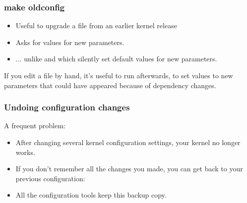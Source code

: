 \begin{frame}
  \frametitle{make oldconfig}
  \begin{itemize}
  \item Useful to upgrade a  file from an earlier kernel release
  \item Asks for values for new parameters.
  \item ... unlike  and  which silently set
  default values for new parameters.
  \end{itemize}
  If you edit a  file by hand, it's useful
  to run  afterwards, to set values to new
  parameters that could have appeared because of dependency changes.
\end{frame}

\begin{frame}
  \frametitle{Undoing configuration changes}
  A frequent problem:
  \begin{itemize}
  \item After changing several kernel configuration settings, your
    kernel no longer works.
  \item If you don't remember all the changes you made,
    you can get back to your previous configuration:\\
  \item All the configuration tools keep this  backup
    copy.
  \end{itemize}
\end{frame}
